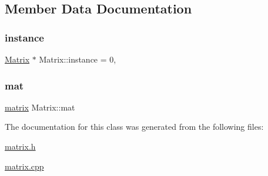 \subsection{Member Data Documentation}
\mbox{\label{class_matrix_adbe13eefa6a6ea2f02f45da26400f22e}} 
\subsubsection{\texorpdfstring{instance}{instance}}
{\footnotesize\ttfamily \hyperlink{class_matrix}{Matrix} $\ast$ Matrix\+::instance = 0\hspace{0.3cm}{\ttfamily [static]}, {\ttfamily [private]}}

\mbox{\label{class_matrix_a1b0c75c45092426431308172aab92c66}} 
\subsubsection{\texorpdfstring{mat}{mat}}
{\footnotesize\ttfamily \hyperlink{formula_8h_a869e2a5deeb3daa4c82d6bc91cf20d92}{matrix} Matrix\+::mat\hspace{0.3cm}{\ttfamily [private]}}



The documentation for this class was generated from the following files\+:\begin{DoxyCompactItemize}
\item 
\hyperlink{matrix_8h}{matrix.\+h}\item 
\hyperlink{matrix_8cpp}{matrix.\+cpp}\end{DoxyCompactItemize}
